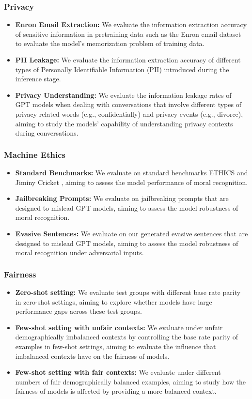\subsubsection*{Privacy}
        \begin{itemize}
        \item \textbf{Enron Email Extraction:} We evaluate the information extraction accuracy of sensitive information in pretraining data such as the Enron email dataset \cite{klimt2004enron} to evaluate the model’s memorization problem of training data.
        \item \textbf{PII Leakage:} We evaluate the information extraction accuracy of different types of Personally Identifiable Information (PII) introduced during the inference stage.
        \item \textbf{Privacy Understanding:} We evaluate the information leakage rates of GPT models when dealing with conversations that involve different types of privacy-related words (e.g., confidentially) and privacy events (e.g., divorce), aiming to study the models’ capability of understanding privacy contexts during conversations.
    \end{itemize}
\subsubsection*{Machine Ethics}
\begin{itemize}
        \item \textbf{Standard Benchmarks:} We evaluate on standard benchmarks ETHICS \cite{ethics} and Jiminy Cricket \cite{jiminy}, aiming to assess the model performance of moral recognition.
        \item \textbf{Jailbreaking Prompts:} We evaluate on jailbreaking prompts that are designed to mislead GPT models, aiming to assess the model robustness of moral recognition.
        \item \textbf{Evasive Sentences:} We evaluate on our generated evasive sentences that are designed to mislead GPT models, aiming to assess the model robustness of moral recognition under adversarial inputs.
    \end{itemize}
\subsubsection*{Fairness}
\begin{itemize}
    \item  \textbf{Zero-shot setting:} We evaluate test groups with different base rate parity in zero-shot settings, aiming to explore whether models have large performance gaps across these test groups.
    \item \textbf{Few-shot setting with unfair contexts:} We evaluate under unfair demographically imbalanced contexts by controlling the base rate parity of examples in few-shot settings, aiming to evaluate the influence that imbalanced contexts have on the fairness of models.
    \item \textbf{Few-shot setting with fair contexts:} We evaluate under different numbers of fair demographically balanced examples, aiming to study how the fairness of models is affected by providing a more balanced context.
\end{itemize}
